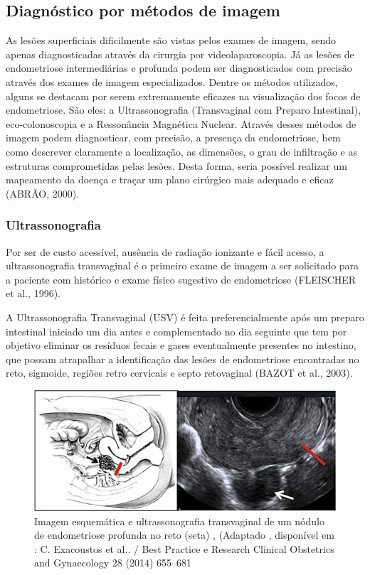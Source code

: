 \documentclass[12pt]{article} %
\begin{document}
\subsection{Diagnóstico por métodos de imagem}

As lesões superficiais dificilmente são vistas pelos exames de imagem, sendo apenas diagnosticadas através da cirurgia por videolaparoscopia. Já as lesões de endometriose intermediárias e profunda podem ser diagnosticados com precisão através dos exames de imagem especializados. Dentre os métodos utilizados, alguns se destacam por serem extremamente eficazes na visualização dos focos de endometriose. São eles: a Ultrassonografia (Transvaginal com Preparo Intestinal), eco-colonoscopia e a Ressonância Magnética Nuclear. Através desses métodos de imagem podem diagnosticar, com precisão, a presença da endometriose, bem como descrever claramente a localização, as dimensões, o grau de infiltração e as estruturas comprometidas pelas lesões. Desta forma, seria possível realizar um mapeamento da doença e traçar um plano cirúrgico mais adequado e eficaz (ABRÃO, 2000).

\subsubsection{Ultrassonografia } 

Por ser de custo acessível, ausência de radiação ionizante e fácil acesso, a ultrassonografia transvaginal é o primeiro exame de imagem a ser solicitado para a paciente com histórico e exame físico sugestivo de endometriose (FLEISCHER et al., 1996).

A Ultrassonografia Transvaginal (USV) é feita  preferencialmente após um preparo intestinal iniciado um dia antes e complementado no dia seguinte que tem por objetivo eliminar os resíduos fecais e gases eventualmente presentes no intestino, que possam atrapalhar a identificação das lesões de endometriose encontradas no reto, sigmoide, regiões retro cervicais e septo retovaginal (BAZOT et al., 2003).

\begin{figure}[h!]
\centering
\includegraphics[width=16cm]{USV.png}
\caption[Imagem esquemática e ultrassonografia transvaginal de um nódulo de endometriose profunda no reto]{Imagem esquemática e ultrassonografia transvaginal de um nódulo de endometriose profunda no reto (seta) , (Adaptado , disponível em : C. Exacoustos et al.. / Best Practice e Research Clinical Obstetrics and Gynaecology 28 (2014) 655–681 }
\end{figure}
\end{document}

